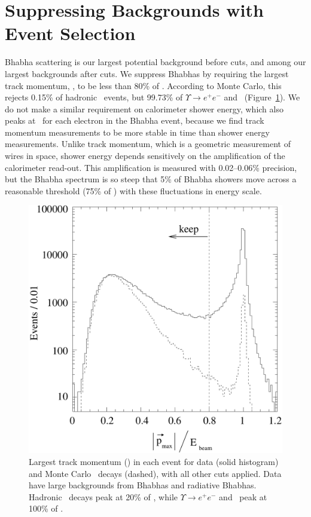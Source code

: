 \documentclass{cornell}
\begin{document}
\section{Suppressing Backgrounds with Event Selection}

Bhabha scattering is our largest potential background before cuts, and
among our largest backgrounds after cuts.  We suppress Bhabhas by
requiring the largest track momentum, \pmax, to be less than 80\% of
\ebeam.  According to Monte Carlo, this rejects 0.15\% of hadronic
\ups\ events, but 99.73\% of $\Upsilon \to e^+e^-$ and \mumu\
(Figure~\ref{pmax}).  We do not make a similar requirement on
calorimeter shower energy, which also peaks at \ebeam\ for each
electron in the Bhabha event, because we find track momentum
measurements to be more stable in time than shower energy
measurements.  Unlike track momentum, which is a geometric measurement
of wires in space, shower energy depends sensitively on the
amplification of the calorimeter read-out.  This amplification is
measured with 0.02--0.06\% precision, but the Bhabha spectrum is so
steep that 5\% of Bhabha showers move across a reasonable
threshold (75\% of \ebeam) with these fluctuations in energy scale.

\begin{figure}[p]
  \begin{center}
    \includegraphics[width=\linewidth]{plots/pmax}
  \end{center}
  \caption[Largest track momentum distribution]{\label{pmax} Largest
  track momentum (\pmax) in each event for data (solid histogram) and
  Monte Carlo \ups\ decays (dashed), with all other cuts applied.
  Data have large backgrounds from Bhabhas and radiative Bhabhas.
  Hadronic \ups\ decays peak at 20\% of \ebeam, while $\Upsilon \to
  e^+e^-$ and \mumu\ peak at 100\% of \ebeam.}
\end{figure}
\end{document}
